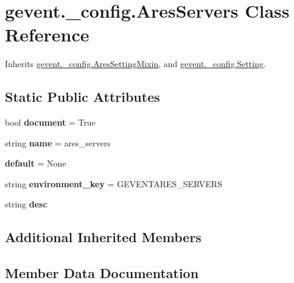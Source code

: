 \hypertarget{classgevent_1_1__config_1_1_ares_servers}{}\section{gevent.\+\_\+config.\+Ares\+Servers Class Reference}
\label{classgevent_1_1__config_1_1_ares_servers}


Inherits \hyperlink{classgevent_1_1__config_1_1_ares_setting_mixin}{gevent.\+\_\+config.\+Ares\+Setting\+Mixin}, and \hyperlink{classgevent_1_1__config_1_1_setting}{gevent.\+\_\+config.\+Setting}.

\subsection*{Static Public Attributes}
\begin{DoxyCompactItemize}
\item 
\mbox{\label{classgevent_1_1__config_1_1_ares_servers_ac2134eecdf4e3040a8ae131ba3f58975}} 
bool {\bfseries document} = True
\item 
\mbox{\label{classgevent_1_1__config_1_1_ares_servers_a336faabbb2558d940e937732b4727132}} 
string {\bfseries name} = \textquotesingle{}ares\+\_\+servers\textquotesingle{}
\item 
\mbox{\label{classgevent_1_1__config_1_1_ares_servers_a9005746605d91b458dfa19e8b59bb814}} 
{\bfseries default} = None
\item 
\mbox{\label{classgevent_1_1__config_1_1_ares_servers_abca7c14b8f2fd7366d28b2c748d4d64d}} 
string {\bfseries environment\+\_\+key} = \textquotesingle{}G\+E\+V\+E\+N\+T\+A\+R\+E\+S\+\_\+\+S\+E\+R\+V\+E\+RS\textquotesingle{}
\item 
string {\bfseries desc}
\end{DoxyCompactItemize}
\subsection*{Additional Inherited Members}


\subsection{Member Data Documentation}
\mbox{\label{classgevent_1_1__config_1_1_ares_servers_a04d54705ec0dcf08bf506dc1d04e862a}} 
